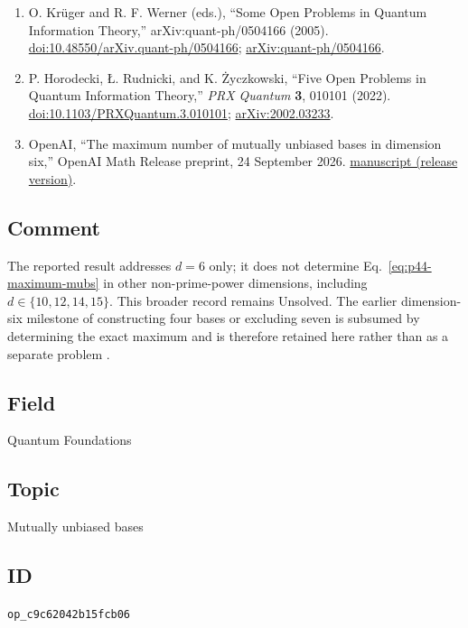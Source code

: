 \begin{enumerate}[label={},leftmargin=4.8em,labelsep=0.5em]
  \item[\textup{[KW05]}]\label{ref:p44-krueger-werner}
  O. Kr\"uger and R. F. Werner (eds.),
  ``Some Open Problems in Quantum Information Theory,''
  arXiv:quant-ph/0504166 (2005).
  \href{https://doi.org/10.48550/arXiv.quant-ph/0504166}{doi:10.48550/arXiv.quant-ph/0504166};
  \href{https://arxiv.org/abs/quant-ph/0504166}{arXiv:quant-ph/0504166}.

  \item[\textup{[HRZ22]}]\label{ref:p44-horodecki-et-al}
  P. Horodecki, \L. Rudnicki, and K. \.{Z}yczkowski,
  ``Five Open Problems in Quantum Information Theory,''
  \emph{PRX Quantum} \textbf{3}, 010101 (2022).
  \href{https://doi.org/10.1103/PRXQuantum.3.010101}{doi:10.1103/PRXQuantum.3.010101};
  \href{https://arxiv.org/abs/2002.03233}{arXiv:2002.03233}.

  \item[\textup{[OAI26]}]\label{ref:p44-openai-dimension-six}
  OpenAI, ``The maximum number of mutually unbiased bases in dimension six,'' OpenAI Math Release preprint, 24 September 2026.
\href{https://github.com/openai/math/blob/adc7f1241b42e322a6451854ab7e4b4c146bf78a/preprints/The-maximum-number-of-mutually-unbiased-bases-in-dimension-six-September-24-2026/The-maximum-number-of-mutually-unbiased-bases-in-dimension-six-September-24-2026.pdf}{manuscript (release version)}.
\end{enumerate}

\subsection*{Comment}

The reported result addresses $d=6$ only; it does not determine
  Eq.~\eqref{eq:p44-maximum-mubs} in other non-prime-power dimensions,
  including $d\in\{10,12,14,15\}$. This broader record remains Unsolved.
  The earlier dimension-six milestone of constructing four bases or
  excluding seven is subsumed by determining the exact maximum and is
  therefore retained here rather than as a separate problem
  .

\subsection*{Field}

Quantum Foundations

\subsection*{Topic}

Mutually unbiased bases

\subsection*{ID}

\texttt{op\_c9c62042b15fcb06}
